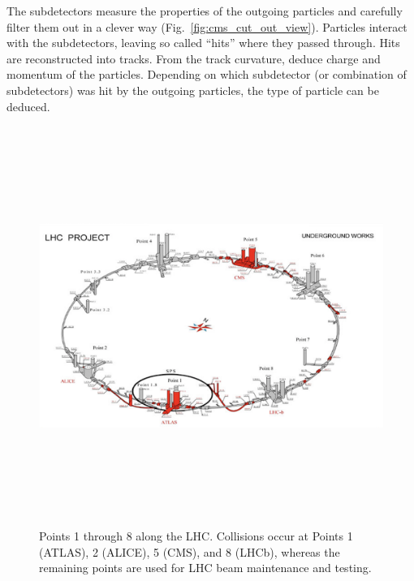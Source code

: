 The subdetectors measure the properties of the outgoing particles and carefully filter them out in a clever way (Fig.~\ref{fig:cms_cut_out_view}).
Particles interact with the subdetectors, leaving so called ``hits'' where they passed through.
Hits are reconstructed into tracks.
From the track curvature, deduce charge and momentum of the particles.
Depending on which subdetector (or combination of subdetectors) was hit by the outgoing particles, the type of particle can be deduced.
\begin{figure}[pbth]
\centering
\includegraphics[width=13cm,height=13cm,keepaspectratio]{figures/lhc/lhc_points_with_buildings.png}
    \caption{
    Points 1 through 8 along the LHC.
    Collisions occur at 
    Points 1 (ATLAS), 2 (ALICE), 5 (CMS), and 8 (LHCb),
    whereas the remaining points are used for LHC beam maintenance and testing.} 
    \label{fig:lhc_points}
\end{figure}
